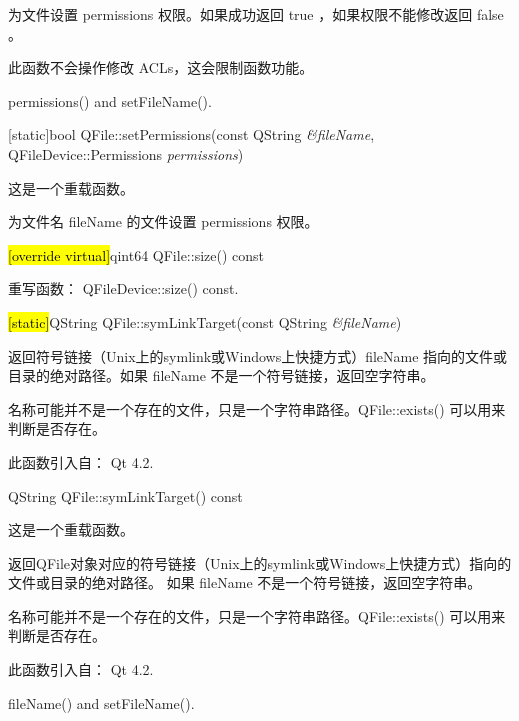 为文件设置 permissions 权限。如果成功返回 true ，如果权限不能修改返回 false 。



\begin{warning}
此函数不会操作修改 ACLs，这会限制函数功能。
\end{warning}

\begin{seeAlso}
permissions() and setFileName().
\end{seeAlso}

\splitLine

[static]bool QFile::setPermissions(const QString \emph{\&fileName}, QFileDevice::Permissions \emph{permissions})

这是一个重载函数。

为文件名 fileName 的文件设置 permissions 权限。

\hl{[override virtual]}qint64 QFile::size() const

重写函数： QFileDevice::size() const.

\splitLine

\hl{[static]}QString QFile::symLinkTarget(const QString \emph{\&fileName})

返回符号链接（Unix上的symlink或Windows上快捷方式）fileName 指向的文件或目录的绝对路径。如果 fileName 不是一个符号链接，返回空字符串。

名称可能并不是一个存在的文件，只是一个字符串路径。QFile::exists() 可以用来判断是否存在。

此函数引入自： Qt 4.2.

\splitLine

QString QFile::symLinkTarget() const

这是一个重载函数。

返回QFile对象对应的符号链接（Unix上的symlink或Windows上快捷方式）指向的文件或目录的绝对路径。
如果 fileName 不是一个符号链接，返回空字符串。

名称可能并不是一个存在的文件，只是一个字符串路径。QFile::exists() 可以用来判断是否存在。

此函数引入自： Qt 4.2.

\begin{seeAlso}
fileName() and setFileName().
\end{seeAlso}
